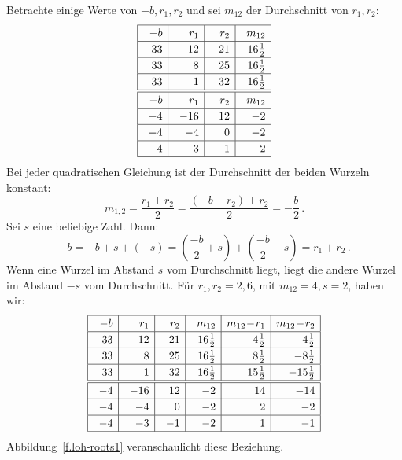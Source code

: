 Betrachte einige Werte von $-b,r_1,r_2$ und sei $m_{12}$ der Durchschnitt von $r_1,r_2$:
\[
\renewcommand{\arraystretch}{1.2}
\begin{array}{|@{\hspace{1em}}r|@{\hspace{1em}}r|@{\hspace{1em}}r|@{\hspace{1em}}r|}
\hline
-b& r_1 & r_2 &m_{12}\\\hline
33 & 12 & 21 & 16\frac{1}{2}\\\hline
33 & 8 & 25 & 16\frac{1}{2}\\\hline
33 & 1 & 32 & 16\frac{1}{2}\\\hline\hline
-b& r_1 & r_2 &m_{12}\\\hline
-4 & -16 & 12 & -2 \\\hline
-4 & -4 & 0 & -2 \\\hline
-4 & -3 & -1 & -2 \\\hline
\end{array}
\]
Bei jeder quadratischen Gleichung ist der Durchschnitt der beiden Wurzeln konstant:
\[
m_{1,2}=\frac{r_1+r_2}{2}=
\frac{(-b-r_2)+r_2}{2}=
-\frac{b}{2}\,.
\]
Sei $s$ eine beliebige Zahl. Dann:
\[
-b=-b+s+(-s)=\left(\frac{-b}{2}+s\right) + \left(\frac{-b}{2}-s\right)=r_1+r_2\,.
\]
Wenn eine Wurzel im Abstand $s$ vom Durchschnitt liegt, liegt die andere Wurzel im Abstand $-s$ vom Durchschnitt. Für $r_1,r_2=2,6$, mit $m_{12}=4, s=2$, haben wir:
\[
\renewcommand{\arraystretch}{1.2}
\begin{array}{|@{\hspace{1em}}r|@{\hspace{1em}}r|@{\hspace{1em}}r|@{\hspace{1em}}r|r|r|}
\hline
-b& r_1 & r_2 & m_{12}& m_{12}\!-\!r_1 & m_{12}\!-\!r_2\\\hline
33 & 12 & 21 & 16\frac{1}{2}&4\frac{1}{2} & -4\frac{1}{2}  \\\hline
33 & 8 & 25 & 16\frac{1}{2}&8\frac{1}{2}&-8\frac{1}{2}\\\hline
33 & 1 & 32 & 16\frac{1}{2}&15\frac{1}{2}&-15\frac{1}{2}\\\hline
\hline
-4 & -16 & 12 & -2 &14& -14\\\hline
-4 & -4 & 0 & -2&2&-2 \\\hline
-4 & -3 & -1 & -2&1&-1 \\\hline
\end{array}
\]
Abbildung~\ref{f.loh-roots1} veranschaulicht diese Beziehung.
